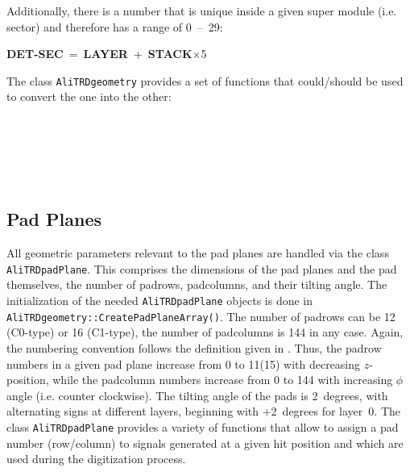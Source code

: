 \documentclass{alicetdr}
\begin{document}
Additionally, there is a number that is unique inside a given super module (i.e. 
sector) and therefore has a range of 0~--~29:
\begin{center}
\mbox{{\bf DET-SEC} = {\bf LAYER} + {\bf STACK}$\times$5}
\end{center}
The class {\tt AliTRDgeometry} provides a set of functions that could/should
be used to convert the one into the other:\\
\hspace*{1.5cm}{\tt AliTRDgeometry::GetDetector(layer,stack,sector)} \\
\hspace*{1.5cm}{\tt AliTRDgeometry::GetDetectorSec(layer,stack)}     \\
\hspace*{1.5cm}{\tt AliTRDgeometry::GetLayer(det)}                   \\
\hspace*{1.5cm}{\tt AliTRDgeometry::GetStack(det)}                   \\
\hspace*{1.5cm}{\tt AliTRDgeometry::GetSector(det)}                  \\
%
\subsection{Pad Planes}
%
All geometric parameters relevant to the pad planes are handled via the
class {\tt AliTRDpadPlane}.  This comprises the dimensions of the pad planes
and the pad themselves, the number of padrows, padcolumns, and their tilting angle.  
The initialization of the needed {\tt AliTRDpadPlane} objects is done in 
{\tt AliTRDgeometry::CreatePadPlaneArray()}.  The number of padrows can be 12 
(C0-type) or 16 (C1-type), the number of padcolumns is 144 in any case.  Again,
the numbering convention follows the definition given in \cite{DAVID}.  Thus,
the padrow numbers in a given pad plane increase from 0 to 11(15) with decreasing
$z$-position, while the padcolumn numbers increase from 0 to 144 with increasing 
$\phi$ angle (i.e. counter clockwise).  The tilting angle of the pads is 2~degrees,
with alternating signs at different layers, beginning with +2~degrees for layer~0.
The class {\tt AliTRDpadPlane} provides a variety of functions that allow to assign 
a pad number (row/column) to signals generated at a given hit position and which
are used during the digitization process.
%
\end{document}
